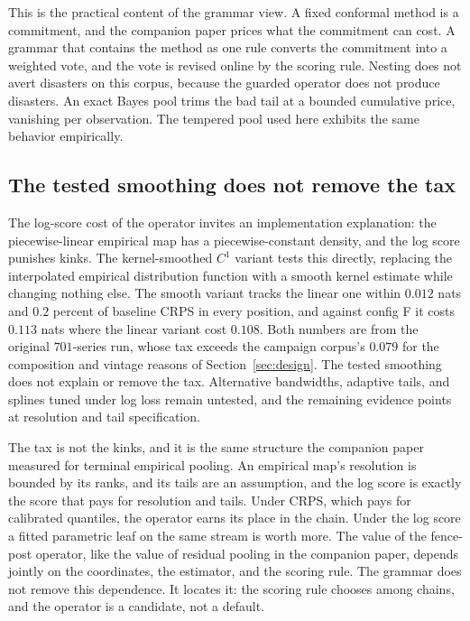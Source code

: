 \documentclass[11pt]{article}
\theoremstyle{remark}
\begin{document}
This is the practical content of the grammar view. A fixed conformal method is
a commitment, and the companion paper prices what the commitment can cost. A grammar that
contains the method as one rule converts the commitment into a weighted vote, and the vote
is revised online by the scoring rule. Nesting does not avert disasters on this corpus,
because the guarded operator does not produce disasters. An exact Bayes pool trims the bad tail at a bounded cumulative price, vanishing per
observation. The tempered pool used here exhibits the same behavior empirically.

\subsection{The tested smoothing does not remove the tax}\label{sec:smooth}

The log-score cost of the operator invites an implementation explanation: the
piecewise-linear empirical map has a piecewise-constant density, and the log score punishes
kinks. The kernel-smoothed $C^1$ variant tests this directly, replacing the interpolated
empirical distribution function with a smooth kernel estimate while changing nothing else.
The smooth variant tracks the linear one within $0.012$ nats and $0.2$ percent of
baseline CRPS in every position, and against config F it costs $0.113$ nats where the
linear variant cost $0.108$. Both numbers are from the original $701$-series run,
whose tax exceeds the campaign corpus's $0.079$ for the composition and vintage
reasons of Section~\ref{sec:design}. The tested smoothing does not explain or remove
the tax.
Alternative bandwidths, adaptive tails, and splines tuned under log loss remain
untested, and the remaining evidence points at resolution and tail specification.

The tax is not the kinks, and it is the same structure the companion paper measured for
terminal empirical pooling. An empirical map's resolution is bounded by its ranks, and its
tails are an assumption, and the log score is exactly the score that pays for resolution
and tails. Under CRPS, which pays for calibrated quantiles, the operator earns its place in
the chain. Under the log score a fitted parametric leaf on the same stream is worth more.
The value of the fence-post operator, like the value of residual pooling in the companion
paper, depends jointly on the coordinates, the estimator, and the scoring rule. The grammar
does not remove this dependence. It locates it: the scoring rule chooses among chains, and
the operator is a candidate, not a default.
\end{document}
